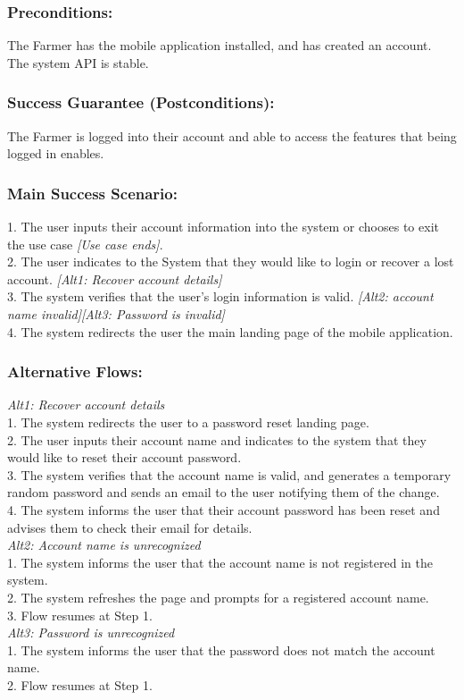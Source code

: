 \documentclass[12pt,letterpaper]{article}
\begin{document}
\subsubsection*{Preconditions:}
The Farmer has the mobile application installed, and has created an account. The system API is stable.

\subsubsection*{Success Guarantee (Postconditions):}
The Farmer is logged into their account and able to access the features that being logged in enables.

\subsubsection*{Main Success Scenario:}
1. The user inputs their account information into the system or chooses to exit the use case \emph{[Use case ends]}.\\
2. The user indicates to the System that they would like to login or recover a lost account. \emph{[Alt1: Recover account details]}\\
3. The system verifies that the user's login information is valid. \emph{[Alt2: account name invalid][Alt3: Password is invalid]}\\
4. The system redirects the user the main landing page of the mobile application.


\subsubsection*{Alternative Flows:}
\emph{Alt1:  Recover account details}\\
1. The system redirects the user to a password reset landing page.\\
2. The user inputs their account name and indicates to the system that they would like to reset their account password. \\
3. The system verifies that the account name is valid, and generates a temporary random password and sends an email to the user notifying them of the change.\\
4. The system informs the user that their account password has been reset and advises them to check their email for details.\\[10pt]
\emph{Alt2: Account name is unrecognized}\\
1. The system informs the user that the account name is not registered in the system.\\
2. The system refreshes the page and prompts for a registered account name.\\
3. Flow resumes at Step 1.\\[10pt]
\emph{Alt3: Password is unrecognized}\\
1. The system informs the user that the password does not match the account name.\\
2. Flow resumes at Step 1.
\end{document}

